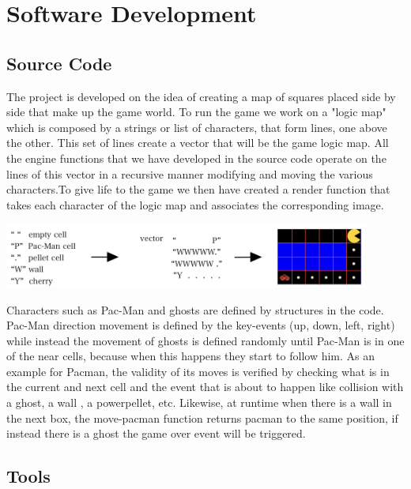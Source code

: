 \documentclass{article}
\begin{document}
 \section{Software Development}

 \subsection{Source Code}
 The project is developed on the idea of creating a map of squares placed side by side that make up the game world. To run the game we work on a "logic map" which is composed by a strings or list of characters, that form lines, one above the other. This set of lines create a vector that will be the game logic map. All the engine functions that we have developed in the source code operate on the lines of this vector in a recursive manner modifying and moving the various characters.To give life to the game we then have created a render function that takes each character of the logic map and associates the corresponding image.\\
 
 \begin{center}
 \includegraphics[width=12cm]{./images/vector.jpeg}
 \end{center}

 Characters such as Pac-Man and ghosts are defined by structures in the code. Pac-Man direction movement is defined by the key-events (up, down, left, right) while instead the movement of ghosts is defined randomly until Pac-Man is in one of the near cells, because when this happens they start to follow him.
 As an example for Pacman, the validity of its moves is verified by checking what is in the current and next cell and the event that is about to happen like collision with a ghost, a wall , a powerpellet, etc. Likewise, at runtime when there is a wall in the next box, the move-pacman function returns pacman to the same position, if instead there is a ghost the game over event will be triggered.
 
 \subsection{Tools}
 
\end{document}
